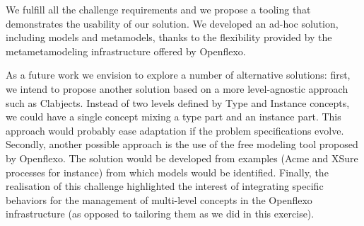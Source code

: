 

We fulfill all the challenge requirements and we propose a tooling that demonstrates the usability of our solution. We developed an ad-hoc solution, including models and metamodels, thanks to the flexibility provided by the metametamodeling infrastructure offered by Openflexo.

As a future work we envision to explore a number of alternative solutions: first, we intend to propose another solution based on a more level-agnostic approach such as Clabjects. Instead of two levels defined by Type and Instance concepts, we could have a single concept mixing a type part and an instance part. This approach would probably ease adaptation if the problem specifications evolve. Secondly, another possible approach is the use of the free modeling tool proposed by Openflexo. The solution would be developed from examples (Acme and XSure processes for instance) from which models would be identified. Finally, the realisation of this challenge highlighted the interest of integrating specific behaviors for the management of multi-level concepts in the Openflexo infrastructure (as opposed to tailoring them as we did in this exercise). %
